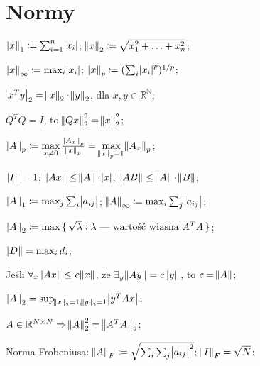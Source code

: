 \section{Normy}


\entry
$\norm{x}_1 \coloneqq \sum^n_{i=1}\abs{x_i}$;
\entry
$\norm{x}_2 \coloneqq \sqrt{x_1^2+\ldots + x_n^2}$;

\entry
$\norm{x}_\infty \coloneqq \max_{i}\abs{x_i}$;
\entry
$\norm{x}_p \coloneqq (\sum_i\abs{x_i}^p)^{1/p}$;

\entry
$\abs{x^Ty}_2=\norm{x}_2\cdot\norm{y}_2$, dla $x,y\in\mathbb{R^N}$;

\entry
$Q^TQ=I$, to $\norm{Qx}^2_2=\norm{x}^2_2$;


\entry
$\norm{A}_p \coloneqq \max\limits_{x\neq 0} \frac{\norm{A_x}_p}{\norm{x}_p} = \max\limits_{\norm{x}_p = 1} \norm{A_x}_p$;

\entry
$\norm{I} = 1$;
\entry
$\norm{Ax} \leq \norm{A} \cdot \abs{x}$;
\entry
$\norm{AB} \leq \norm{A} \cdot \norm{B}$;

\entry
$\norm{A}_1 \coloneqq \max_j\sum_i\abs{a_{ij}}$;
\entry
$\norm{A}_\infty \coloneqq \max_i\sum_j\abs{a_{ij}}$;

\entry
$\norm{A}_2 \coloneqq \max\set{\sqrt{\lambda} : \lambda\text{ --- wartość własna } A^TA}$;

\entry
$\norm{D} = \max_i d_i$;

\entry
Jeśli $\forall_{x} \norm{Ax}\leq c\norm{x}$, że $\exists_y \norm{Ay} = c\norm{y}$, to $c=\norm{A}$;

\entry
$\norm{A}_2 = \sup_{\norm{x}_2=1, \norm{y}_2=1}\abs{y^TAx}$;

\entry
$A\in\mathbb{R}^{N\times N} \Rightarrow \norm{A}^2_2=\norm{A^TA}_2$;


\entry
Norma Frobeniusa: $\norm{A}_F \coloneqq \sqrt{\sum_i\sum_j\abs{a_{ij}}^2}$; $\norm{I}_F=\sqrt{N}$;


